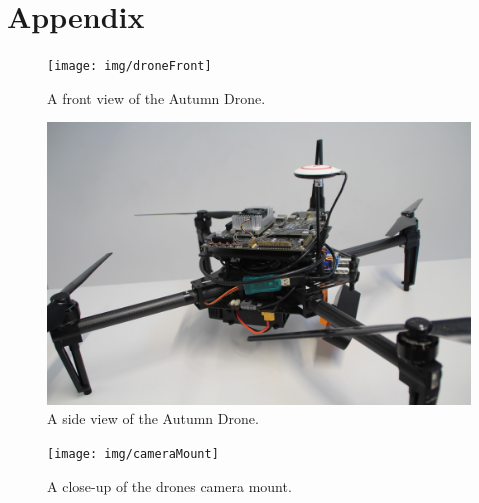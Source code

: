 \chapter*{Appendix}
\label{chapter:appendix}


\begin{figure}[!ht]
	\centering
	\texttt{[image: img/droneFront]}
	\caption{
		A front view of the Autumn Drone.
	}
	\label{fig:droneFront}
\end{figure}

\pagebreak

\begin{figure}[!ht]
	\centering
	\includegraphics[width=0.9\linewidth]{img/droneSide}
	\caption{
		A side view of the Autumn Drone.
	}
	\label{fig:droneSide}
\end{figure}

\pagebreak

\begin{figure}[!ht]
	\centering
	\texttt{[image: img/cameraMount]}
	\caption{
		A close-up of the drones camera mount.
	}
	\label{fig:cameraMount}
\end{figure}

\pagebreak






